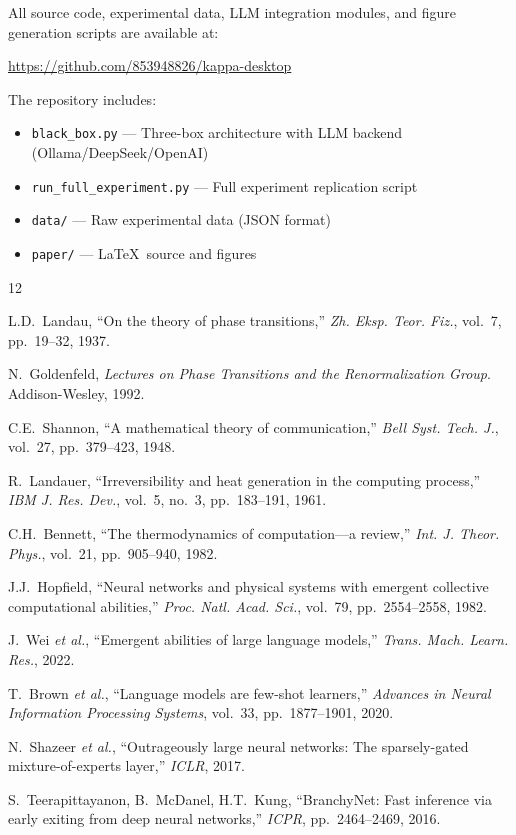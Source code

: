 \documentclass[10pt,twocolumn]{article}
\begin{document}
All source code, experimental data, LLM integration
modules, and figure generation scripts are available at:

\begin{center}
\url{https://github.com/853948826/kappa-desktop}
\end{center}

\noindent The repository includes:
\begin{itemize}
  \item \texttt{black\_box.py} --- Three-box architecture
    with LLM backend (Ollama/DeepSeek/OpenAI)
  \item \texttt{run\_full\_experiment.py} --- Full
    experiment replication script
  \item \texttt{data/} --- Raw experimental data
    (JSON format)
  \item \texttt{paper/} --- \LaTeX\ source and figures
\end{itemize}

\begin{thebibliography}{12}

L.D.~Landau, 
``On the theory of phase transitions,'' 
\textit{Zh. Eksp. Teor. Fiz.}, 
vol.~7, pp.~19--32, 1937.

N.~Goldenfeld, 
\textit{Lectures on Phase Transitions and the 
Renormalization Group}. 
Addison-Wesley, 1992.

C.E.~Shannon, 
``A mathematical theory of communication,'' 
\textit{Bell Syst. Tech. J.}, 
vol.~27, pp.~379--423, 1948.

R.~Landauer, 
``Irreversibility and heat generation in the computing 
process,'' 
\textit{IBM J. Res. Dev.}, 
vol.~5, no.~3, pp.~183--191, 1961.

C.H.~Bennett, 
``The thermodynamics of computation---a review,'' 
\textit{Int. J. Theor. Phys.}, 
vol.~21, pp.~905--940, 1982.

J.J.~Hopfield, 
``Neural networks and physical systems with emergent 
collective computational abilities,'' 
\textit{Proc. Natl. Acad. Sci.}, 
vol.~79, pp.~2554--2558, 1982.

J.~Wei \textit{et al.}, 
``Emergent abilities of large language models,'' 
\textit{Trans. Mach. Learn. Res.}, 2022.

T.~Brown \textit{et al.}, 
``Language models are few-shot learners,'' 
\textit{Advances in Neural Information Processing Systems}, 
vol.~33, pp.~1877--1901, 2020.

N.~Shazeer \textit{et al.}, 
``Outrageously large neural networks: The 
sparsely-gated mixture-of-experts layer,'' 
\textit{ICLR}, 2017.

S.~Teerapittayanon, B.~McDanel, H.T.~Kung, 
``BranchyNet: Fast inference via early exiting from 
deep neural networks,'' 
\textit{ICPR}, pp.~2464--2469, 2016.

\end{thebibliography}
\end{document}
